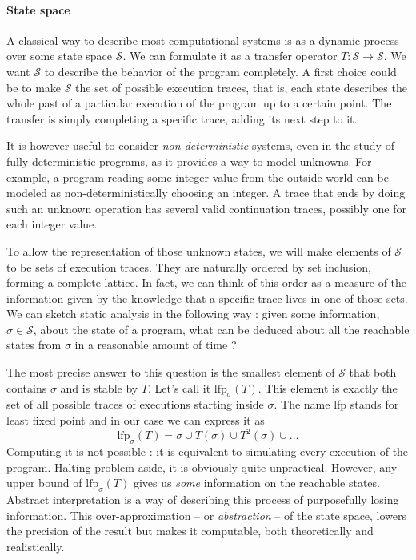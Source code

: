 \documentclass[11pt]{article}
\renewcommand{\S}{\mathcal{S}}
\newcommand{\lfp}{\text{lfp}}
\begin{document}
\paragraph{State space} A classical way to describe most computational systems is as a dynamic process over some state space $\S$. We can formulate it as a transfer operator $T:\S\to\S$. We want $\S$ to describe the behavior of the program completely. A first choice could be to make $\S$ the set of possible execution traces, that is, each state describes the whole past of a particular execution of the program up to a certain point. The transfer is simply completing a specific trace, adding its next step to it.

It is however useful to consider \emph{non-deterministic} systems, even in the study of fully deterministic programs, as it provides a way to model unknowns. For example, a program reading some integer value from the outside world can be modeled as non-deterministically choosing an integer. A trace that ends by doing such an unknown operation has several valid continuation traces, possibly one for each integer value.

To allow the representation of those unknown states, we will make elements of $\S$ to be sets of execution traces. They are naturally ordered by set inclusion, forming a complete lattice.
In fact, we can think of this order as a measure of the information given by the knowledge that a specific trace lives in one of those sets.
We can sketch static analysis in the following way : given some information, $\sigma\in\S$, about the state of a program, what can be deduced about
all the reachable states from $\sigma$ in a reasonable amount of time ?

The most precise answer to this question is the smallest element of $\S$ that both contains $\sigma$ and is stable by $T$. Let's call it $\lfp_\sigma(T)$. This element is exactly the set of all possible traces of executions starting inside $\sigma$. The name lfp stands for least fixed point and in our case we can express it as 
\[ \text{lfp}_\sigma(T) = \sigma \cup T(\sigma) \cup T^2(\sigma) \cup \dots \]
Computing it is not possible : it is equivalent to simulating every execution of the program. Halting problem aside, it is obviously quite unpractical. However, any upper bound of $\lfp_\sigma(T)$ gives us \emph{some} information on the reachable states. Abstract interpretation is a way of describing this process of purposefully losing information. This over-approximation -- or \emph{abstraction} -- of the state space, lowers the precision of the result but makes it computable, both theoretically and realistically.
\end{document}
